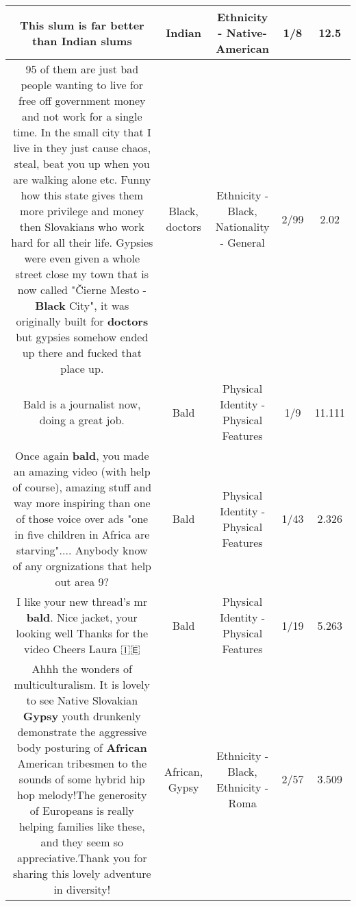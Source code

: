 \documentclass[11pt]{article}
\newlength\mylength
\begin{document}
\begin{center}
\begin{longtable}{|C{.65\mylength}|C{.30\mylength}|C{.12\mylength}|C{.12\mylength}|C{.12\mylength}|}
  \small This slum is far better than \textbf{Indian} slums\normalsize   & Indian & Ethnicity - Native-American & 1/8 & 12.5 \\  \hline
  \small 95 of them are just bad people wanting to live for free off government money and not work for a single time. In the small city that I live in they just cause chaos, steal, beat you up when you are walking alone etc. Funny how this state gives them more privilege and money then Slovakians who work hard for all their life. Gypsies were even given a whole street close my town that is now called "Čierne Mesto - \textbf{Black} City", it was originally built for \textbf{doctors} but gypsies somehow ended up there and fucked that place up.\normalsize   & Black, doctors & Ethnicity - Black, Nationality - General & 2/99 & 2.02 \\  \hline
  \small Bald is a journalist now, doing a great job.\normalsize   & Bald & Physical Identity - Physical Features & 1/9 & 11.111 \\  \hline
  \small Once again \textbf{bald}, you made an amazing video (with help of course), amazing stuff and way more inspiring than one of those voice over ads "one in five children in Africa are starving".... Anybody know of any orgnizations that help out area 9?\normalsize   & Bald & Physical Identity - Physical Features & 1/43 & 2.326 \\  \hline
  \small I like your new thread's mr \textbf{bald}. Nice jacket, your looking well Thanks for the video Cheers Laura 🇮🇪\normalsize   & Bald & Physical Identity - Physical Features & 1/19 & 5.263 \\  \hline
  \small Ahhh the wonders of multiculturalism. It is lovely to see Native Slovakian \textbf{Gypsy} youth drunkenly demonstrate the aggressive body posturing of \textbf{African} American tribesmen to the sounds of some hybrid hip hop melody!The generosity of Europeans is really helping families like these, and they seem so appreciative.Thank you for sharing this lovely adventure in diversity!\normalsize   & African, Gypsy & Ethnicity - Black, Ethnicity - Roma & 2/57 & 3.509 \\  \hline

\end{longtable}
\end{center}
\end{document}
